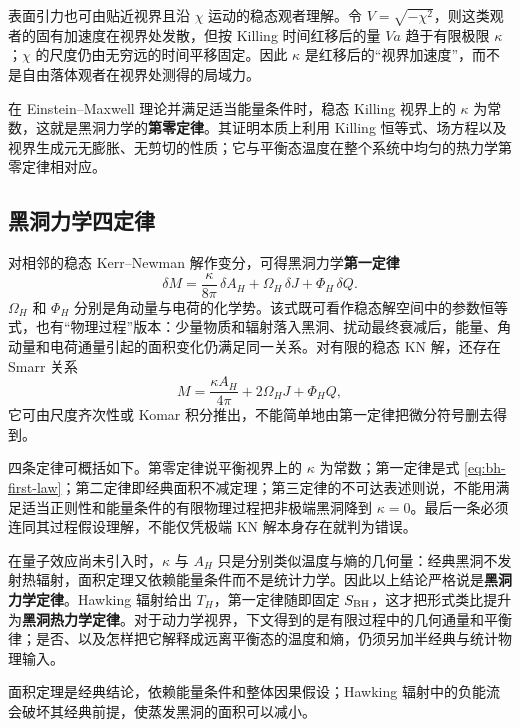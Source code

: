 表面引力也可由贴近视界且沿 $\chi$ 运动的稳态观者理解。令 $V=\sqrt{-\chi^2}$，则这类观者的固有加速度在视界处发散，但按 Killing 时间红移后的量 $Va$ 趋于有限极限 $\kappa$；$\chi$ 的尺度仍由无穷远的时间平移固定。因此 $\kappa$ 是红移后的“视界加速度”，而不是自由落体观者在视界处测得的局域力。

在 Einstein--Maxwell 理论并满足适当能量条件时，稳态 Killing 视界上的 $\kappa$ 为常数，这就是黑洞力学的\textbf{第零定律}。其证明本质上利用 Killing 恒等式、场方程以及视界生成元无膨胀、无剪切的性质；它与平衡态温度在整个系统中均匀的热力学第零定律相对应。





\subsection{黑洞力学四定律}

对相邻的稳态 Kerr--Newman 解作变分，可得黑洞力学\textbf{第一定律}
\begin{equation}\label{eq:bh-first-law}
    \delta M=\frac{\kappa}{8\pi}\,\delta A_H
       +\Omega_H\,\delta J+\Phi_H\,\delta Q .
\end{equation}
$\Omega_H$ 和 $\Phi_H$ 分别是角动量与电荷的化学势。该式既可看作稳态解空间中的参数恒等式，也有“物理过程”版本：少量物质和辐射落入黑洞、扰动最终衰减后，能量、角动量和电荷通量引起的面积变化仍满足同一关系。对有限的稳态 KN 解，还存在 Smarr 关系
\begin{equation}\label{eq:bh-smarr}
    M=\frac{\kappa A_H}{4\pi}+2\Omega_HJ+\Phi_HQ,
\end{equation}
它可由尺度齐次性或 Komar 积分推出，不能简单地由第一定律把微分符号删去得到。

四条定律可概括如下。第零定律说平衡视界上的 $\kappa$ 为常数；第一定律是式 \eqref{eq:bh-first-law}；第二定律即经典面积不减定理；第三定律的不可达表述则说，不能用满足适当正则性和能量条件的有限物理过程把非极端黑洞降到 $\kappa=0$。最后一条必须连同其过程假设理解，不能仅凭极端 KN 解本身存在就判为错误。

在量子效应尚未引入时，$\kappa$ 与 $A_H$ 只是分别类似温度与熵的几何量：经典黑洞不发射热辐射，面积定理又依赖能量条件而不是统计力学。因此以上结论严格说是\textbf{黑洞力学定律}。Hawking 辐射给出 $T_H$，第一定律随即固定 $S_{\rm BH}$，这才把形式类比提升为\textbf{黑洞热力学定律}。对于动力学视界，下文得到的是有限过程中的几何通量和平衡律；是否、以及怎样把它解释成远离平衡态的温度和熵，仍须另加半经典与统计物理输入。

面积定理是经典结论，依赖能量条件和整体因果假设；Hawking 辐射中的负能流会破坏其经典前提，使蒸发黑洞的面积可以减小。

